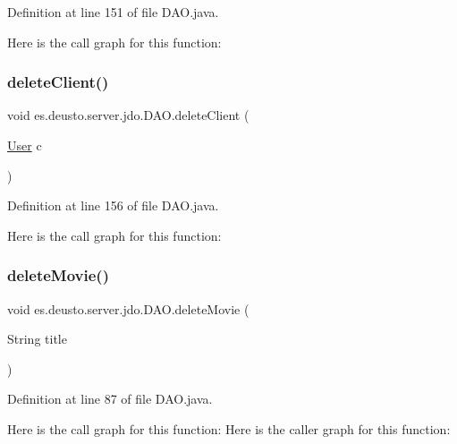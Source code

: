 Definition at line 151 of file D\+A\+O.\+java.

Here is the call graph for this function\+:
\mbox{\label{classes_1_1deusto_1_1server_1_1jdo_1_1_d_a_o_aa914bb9b49e39cfa9a1254ce578aaae1}} 
\subsubsection{\texorpdfstring{deleteClient()}{deleteClient()}\hspace{0.1cm}{\footnotesize\ttfamily [2/2]}}
{\footnotesize\ttfamily void es.\+deusto.\+server.\+jdo.\+D\+A\+O.\+delete\+Client (\begin{DoxyParamCaption}\item[{\mbox{\hyperlink{classes_1_1deusto_1_1server_1_1jdo_1_1_user}{User}}}]{c }\end{DoxyParamCaption})}



Definition at line 156 of file D\+A\+O.\+java.

Here is the call graph for this function\+:
\mbox{\label{classes_1_1deusto_1_1server_1_1jdo_1_1_d_a_o_a9bcf552682ef562673a7c725d003debf}} 
\subsubsection{\texorpdfstring{deleteMovie()}{deleteMovie()}\hspace{0.1cm}{\footnotesize\ttfamily [1/2]}}
{\footnotesize\ttfamily void es.\+deusto.\+server.\+jdo.\+D\+A\+O.\+delete\+Movie (\begin{DoxyParamCaption}\item[{String}]{title }\end{DoxyParamCaption})}



Definition at line 87 of file D\+A\+O.\+java.

Here is the call graph for this function\+:
Here is the caller graph for this function\+:
\mbox{\label{classes_1_1deusto_1_1server_1_1jdo_1_1_d_a_o_a479ca9a8597aada4e74445699140e0fd}} 
